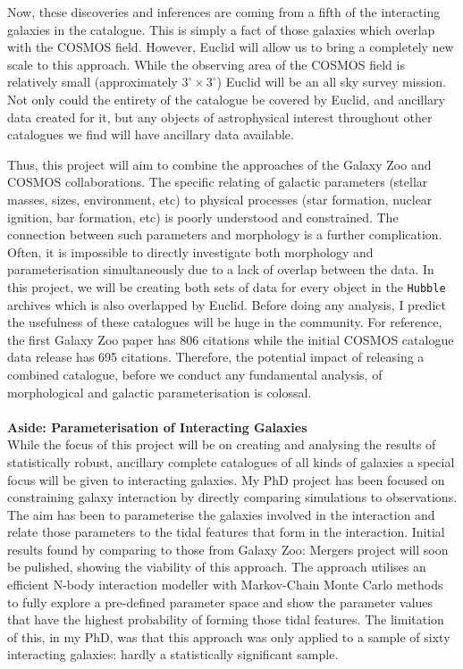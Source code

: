 \documentclass[11pt,usenatbib]{article}
\begin{document}
Now, these discoveries and inferences are coming from a fifth of the interacting galaxies in the \citet{O'Ryan} catalogue. This is simply a fact of those galaxies which overlap with the COSMOS field. However, Euclid will allow us to bring a completely new scale to this approach. While the observing area of the COSMOS field is relatively small (approximately $3^{\circ} \times 3^{\circ}$) Euclid will be an all sky survey mission. Not only could the entirety of the \citet{O'Ryan} catalogue be covered by Euclid, and ancillary data created for it, but any objects of astrophysical interest throughout other catalogues we find will have ancillary data available.

Thus, this project will aim to combine the approaches of the Galaxy Zoo and COSMOS collaborations. The specific relating of galactic parameters (stellar masses, sizes, environment, etc) to physical processes (star formation, nuclear ignition, bar formation, etc) is poorly understood and constrained. The connection between such parameters and morphology is a further complication. Often, it is impossible to directly investigate both morphology and parameterisation simultaneously due to a lack of overlap between the data. In this project, we will be creating both sets of data for every object in the \texttt{Hubble} archives which is also overlapped by Euclid. Before doing any analysis, I predict the usefulness of these catalogues will be huge in the community. For reference, the first Galaxy Zoo paper \citep{lintott_08} has 806 citations while the initial COSMOS catalogue data release has 695 citations. Therefore, the potential impact of releasing a combined catalogue, before we conduct any fundamental analysis, of morphological and galactic parameterisation is colossal.
\\
\\
\noindent \textbf{Aside: Parameterisation of Interacting Galaxies} \\
\noindent While the focus of this project will be on creating and analysing the results of statistically robust, ancillary complete catalogues of all kinds of galaxies a special focus will be given to interacting galaxies. My PhD project has been focused on constraining galaxy interaction by directly comparing simulations to observations. The aim has been to parameterise the galaxies involved in the interaction and relate those parameters to the tidal features that form in the interaction. Initial results found by comparing to those from Galaxy Zoo: Mergers project will soon be pulished, showing the viability of this approach. The approach utilises an efficient N-body interaction modeller with Markov-Chain Monte Carlo methods to fully explore a pre-defined parameter space and show the parameter values that have the highest probability of forming those tidal features. The limitation of this, in my PhD, was that this approach was only applied to a sample of sixty interacting galaxies: hardly a statistically significant sample. 
\end{document}
